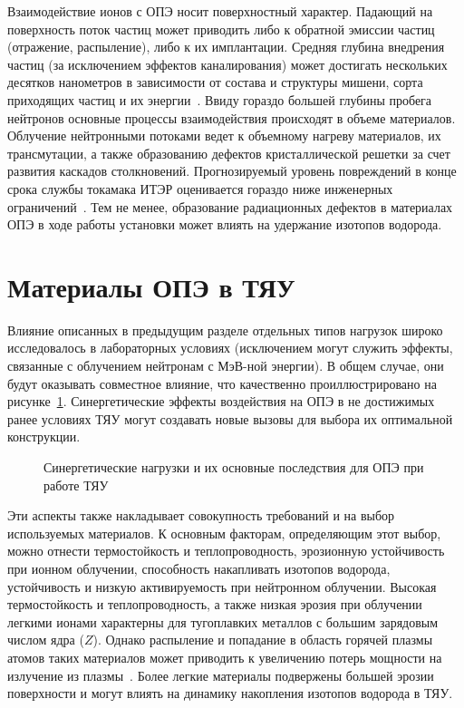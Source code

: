 Взаимодействие ионов с ОПЭ носит поверхностный характер. Падающий на поверхность поток частиц может приводить либо к обратной эмиссии частиц (отражение, распыление), либо к их имплантации. Средняя глубина внедрения частиц (за исключением эффектов каналирования) может достигать нескольких десятков нанометров в зависимости от состава и структуры мишени, сорта приходящих частиц и их энергии~\cite{eckstein2010penetration}. Ввиду гораздо большей глубины пробега нейтронов основные процессы взаимодействия происходят в объеме материалов. Облучение нейтронными потоками ведет к объемному нагреву материалов, их трансмутации, а также образованию дефектов кристаллической решетки за счет развития каскадов столкновений. Прогнозируемый уровень повреждений в конце срока службы токамака ИТЭР оценивается гораздо ниже инженерных ограничений~\cite{Villari2013}. Тем не менее, образование радиационных дефектов в материалах ОПЭ в ходе работы установки может влиять на удержание изотопов водорода.

\section{Материалы ОПЭ в ТЯУ}\label{sec:ch1/sec2}

Влияние описанных в предыдущим разделе отдельных типов нагрузок широко исследовалось в лабораторных условиях (исключением могут служить эффекты, связанные с облучением нейтронам с МэВ-ной энергии). В общем случае, они будут оказывать совместное влияние, что качественно проиллюстрировано на рисунке~\cref{fig:ch1/synergetic_diagram}. Синергетические эффекты воздействия на ОПЭ в не достижимых ранее условиях ТЯУ могут создавать новые вызовы для выбора их оптимальной конструкции.
\begin{figure}[ht]
    \caption{Синергетические нагрузки и их основные последствия для ОПЭ при работе ТЯУ~\cite{Linke2019}}\label{fig:ch1/synergetic_diagram}
\end{figure}
Эти аспекты также накладывает совокупность требований и на выбор используемых материалов. К основным факторам, определяющим этот выбор, можно отнести термостойкость и теплопроводность, эрозионную устойчивость при ионном облучении, способность накапливать изотопов водорода, устойчивость и низкую активируемость при нейтронном облучении. Высокая термостойкость и теплопроводность, а также низкая эрозия при облучении легкими ионами характерны для тугоплавких металлов с большим зарядовым числом ядра ($Z$). Однако распыление и попадание в область горячей плазмы атомов таких материалов может приводить к увеличению потерь мощности на излучение из плазмы~\cite{Ptterich2019}. Более легкие материалы подвержены большей эрозии поверхности и могут влиять на динамику накопления изотопов водорода в ТЯУ. 

